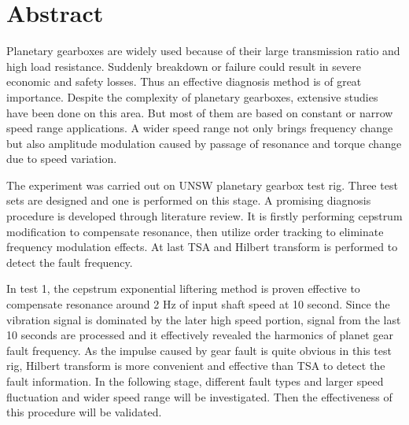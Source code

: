 \chapter*{Abstract}\label{abstract}

Planetary gearboxes are widely used because of their large transmission ratio and high load resistance. Suddenly breakdown or failure could result in severe economic and safety losses. Thus an effective diagnosis method is of great importance. Despite the complexity of planetary gearboxes, extensive studies have been done on this area. But most of them are based on constant or narrow speed range applications. A wider speed range not only brings frequency change but also amplitude modulation caused by passage of resonance and torque change due to speed variation.

The experiment was carried out on UNSW planetary gearbox test rig. Three test sets are designed and one is performed on this stage. A promising diagnosis procedure is developed through literature review. It is firstly performing cepstrum modification to compensate resonance, then utilize order tracking to eliminate frequency modulation effects. At last TSA and Hilbert transform is performed to detect the fault frequency.

In test 1, the cepstrum exponential liftering method is proven effective to compensate resonance around 2 Hz of input shaft speed at 10 second. Since the vibration signal is dominated by the later high speed portion, signal from the last 10 seconds are processed and it effectively revealed the harmonics of planet gear fault frequency. As the impulse caused by gear fault is quite obvious in this test rig, Hilbert transform is more convenient and effective than TSA to detect the fault information. In the following stage, different fault types and larger speed fluctuation and wider speed range will be investigated. Then the effectiveness of this procedure will be validated.
